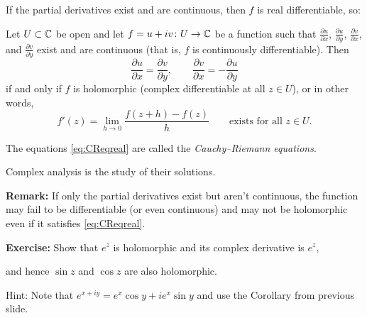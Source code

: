 \documentclass[10pt,aspectratio=169]{beamer}
\begin{document}
\begin{frame}

If the partial derivatives exist and are continuous, then $f$ is real
differentiable, so:

\pause

\begin{corollary}
Let $U \subset {\mathbb{C}}$ be open and let $f = u+iv \colon U \to {\mathbb{C}}$ be a function
such that $\frac{\partial u}{\partial x}$, $\frac{\partial u}{\partial y}$, $\frac{\partial
v}{\partial x}$, and $\frac{\partial v}{\partial y}$ exist and are continuous (that is,
$f$ is continuously differentiable).
\pause
Then
\begin{equation} \label{eq:CReqreal}
\frac{\partial u}{\partial x} = \frac{\partial v}{\partial y} , \qquad
\frac{\partial v}{\partial x} = -\frac{\partial u}{\partial y}
\end{equation}
if and only if $f$ is holomorphic (complex differentiable at all $z \in U$),
\pause
or in other words,
\begin{equation*}
f'(z) =
\lim_{h \to 0} \frac{f(z+h) - f(z)}{h}
\qquad
\text{exists for all $z \in U$.}
\end{equation*}
\end{corollary}

\pause

The equations \eqref{eq:CReqreal} are called the
\emph{Cauchy--Riemann equations}.

\medskip
\pause

Complex analysis is the study of their solutions.

\medskip
\pause

\textbf{Remark:} If only the partial derivatives exist but aren't
continuous, the function may fail to be differentiable (or even continuous)
and may not be holomorphic even if it satisfies
\eqref{eq:CReqreal}.

\end{frame}

\begin{frame}
\textbf{Exercise:}
Show that $e^z$ is holomorphic and its complex derivative is $e^z$,

and hence $\sin z$ and $\cos z$ are also holomorphic.

\medskip
\pause

Hint: Note that $e^{x+iy} = e^x \cos y + i e^x \sin y$ and use the
Corollary from previous slide.
\end{frame}
\end{document}
